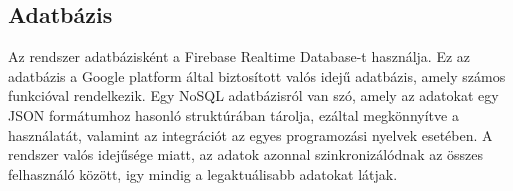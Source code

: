 \subsection{Adatbázis}

Az rendszer adatbázisként a Firebase Realtime Database-t használja. Ez az adatbázis a Google platform által biztosított valós idejű adatbázis, amely számos funkcióval rendelkezik. Egy NoSQL adatbázisról van szó, amely az adatokat egy JSON formátumhoz hasonló struktúrában tárolja, ezáltal megkönnyítve a használatát, valamint az integrációt az egyes programozási nyelvek esetében. A rendszer valós idejűsége miatt, az adatok azonnal szinkronizálódnak az összes felhasználó között, igy mindig a legaktuálisabb adatokat látjak.
